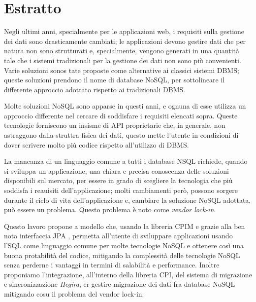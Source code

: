 \thispagestyle{empty}

\chapter*{Estratto}
Negli ultimi anni, specialmente per le applicazioni web, i requisiti sulla gestione dei dati sono drasticamente cambiati; le applicazioni devono gestire dati che per natura non sono strutturati e, specialmente, vengono generati in una quantità tale che i sistemi tradizionali per la gestione dei dati non sono più convenienti. Varie soluzioni sonos tate proposte come alternative ai classici sistemi DBMS; queste soluzioni prendono il nome di database NoSQL, per sottolineare il differente approccio adottato rispetto ai tradizionali DBMS.

\noindent Molte soluzioni NoSQL sono apparse in questi anni, e ognuna di esse utilizza un approccio differente nel cercare di soddisfare i requisiti elencati sopra. Queste tecnologie forniscono un insisme di API proprietarie che, in generale, non astraggono dalla struttra fisica dei dati, questo mette l'utente in condizioni di dover scrivere molto più codice rispetto all'utilizzo di DBMS.

\noindent La mancanza di un linguaggio comune a tutti i database NSQL richiede, quando si sviluppa un applicazione, una chiara e precisa conoscenza delle soluzioni disponibili sul mercato, per essere in grado di scegliere la tecnologia che più soddisfa i reauisiti dell'applicazione; molti cambiamenti però, possono sorgere durante il ciclo di vita dell'applicazione e, cambiare la soluzione NoSQL adottata, può essere un problema. Questo problema è noto come \textit{vendor lock-in}.

\noindent Questo lavoro propone a modello che, usando la libreria CPIM e grazie alla ben nota interfaccia JPA , permetta all'utente di sviluppare applicazioni usando l'SQL come linguaggio comune per molte tecnologie NoSQL e ottenere così una buona protabilità del codice, mitigando la complessità delle tecnologie NoSQL senza perderne i vantaggi in termini di salabilità e performance. Inoltre proponiamo l'integrazione, all'interno della libreria CPI, del sistema di migrazione e sincronizzazione \textit{Hegira}, er gestire migrazione dei dati fra database NoSQL mitigando cosu il problema del vendor lock-in.

